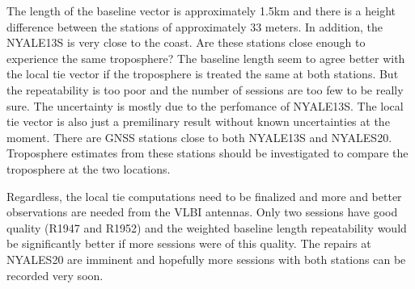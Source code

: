 The length of the baseline 
vector is approximately 1.5km and there is a height difference between the stations of approximately
33 meters. In addition, the NYALE13S is very close to the coast. Are these stations close
enough to experience the same troposphere? The baseline length seem to agree better with the local tie
vector if the troposphere is treated the same at both stations. But the repeatability is too poor and
the number of sessions are too few to be really sure. The uncertainty is mostly due to the perfomance of 
NYALE13S. The local tie vector is also just a premilinary 
result without known uncertainties at the moment. There are GNSS stations close to both NYALE13S and
NYALES20. Troposphere estimates from these stations should be investigated to compare the troposphere
at the two locations.  
 
Regardless, the local tie computations need to be finalized and more and better observations are needed
from the VLBI antennas. Only two sessions have good quality (R1947 and R1952) and the weighted baseline
length repeatability would be significantly better if more sessions were of this quality. The repairs at
NYALES20 are imminent and hopefully more sessions with both stations can be recorded very soon.

\endinput
